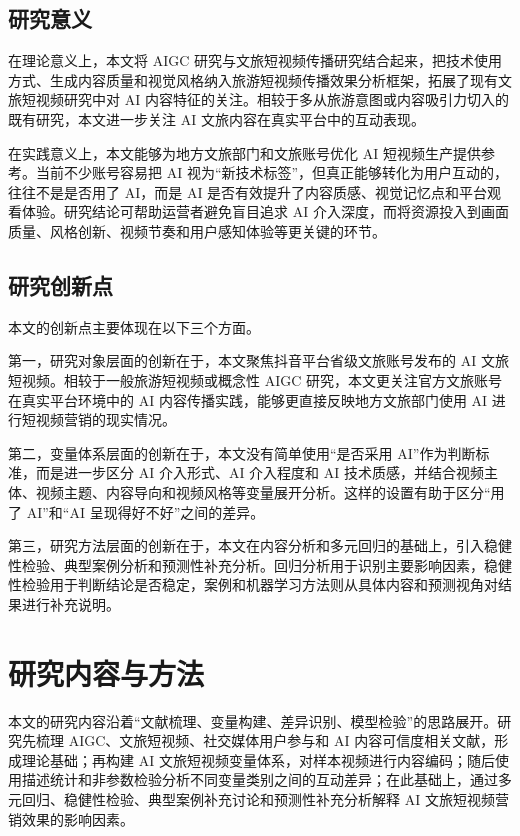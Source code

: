 \subsection{研究意义}

在理论意义上，本文将 AIGC 研究与文旅短视频传播研究结合起来，把技术使用方式、生成内容质量和视觉风格纳入旅游短视频传播效果分析框架，拓展了现有文旅短视频研究中对 AI 内容特征的关注。相较于多从旅游意图或内容吸引力切入的既有研究\cite{lit04}，本文进一步关注 AI 文旅内容在真实平台中的互动表现。

在实践意义上，本文能够为地方文旅部门和文旅账号优化 AI 短视频生产提供参考。当前不少账号容易把 AI 视为“新技术标签”，但真正能够转化为用户互动的，往往不是是否用了 AI，而是 AI 是否有效提升了内容质感、视觉记忆点和平台观看体验。研究结论可帮助运营者避免盲目追求 AI 介入深度，而将资源投入到画面质量、风格创新、视频节奏和用户感知体验等更关键的环节。

\subsection{研究创新点}

本文的创新点主要体现在以下三个方面。

第一，研究对象层面的创新在于，本文聚焦抖音平台省级文旅账号发布的 AI 文旅短视频。相较于一般旅游短视频或概念性 AIGC 研究，本文更关注官方文旅账号在真实平台环境中的 AI 内容传播实践，能够更直接反映地方文旅部门使用 AI 进行短视频营销的现实情况。

第二，变量体系层面的创新在于，本文没有简单使用“是否采用 AI”作为判断标准，而是进一步区分 AI 介入形式、AI 介入程度和 AI 技术质感，并结合视频主体、视频主题、内容导向和视频风格等变量展开分析。这样的设置有助于区分“用了 AI”和“AI 呈现得好不好”之间的差异。

第三，研究方法层面的创新在于，本文在内容分析和多元回归的基础上，引入稳健性检验、典型案例分析和预测性补充分析。回归分析用于识别主要影响因素，稳健性检验用于判断结论是否稳定，案例和机器学习方法则从具体内容和预测视角对结果进行补充说明。

\section{研究内容与方法}

本文的研究内容沿着“文献梳理、变量构建、差异识别、模型检验”的思路展开。研究先梳理 AIGC、文旅短视频、社交媒体用户参与和 AI 内容可信度相关文献，形成理论基础；再构建 AI 文旅短视频变量体系，对样本视频进行内容编码；随后使用描述统计和非参数检验分析不同变量类别之间的互动差异；在此基础上，通过多元回归、稳健性检验、典型案例补充讨论和预测性补充分析解释 AI 文旅短视频营销效果的影响因素。

